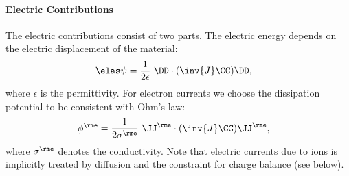 \paragraph{Electric Contributions}%
  The electric contributions consist of two parts. The electric energy depends on the electric displacement of the material:
  \begin{align}
    \psie &= \frac{1}{2\epsilon} \ \DD\cdot(\inv{J}\CC) \DD,
  \end{align}
  where $\epsilon$ is the permittivity. For electron currents we choose the dissipation potential to be consistent with Ohm's law: 
  \begin{align}
    \phi^\rme &= \frac{1}{2\sigmae} \ \JJe \cdot (\inv{J}\CC) \JJe,
  \end{align}
  where $\sigmae$ denotes the conductivity. Note that electric currents due to ions is implicitly treated by diffusion and the constraint for charge balance (see below). 

